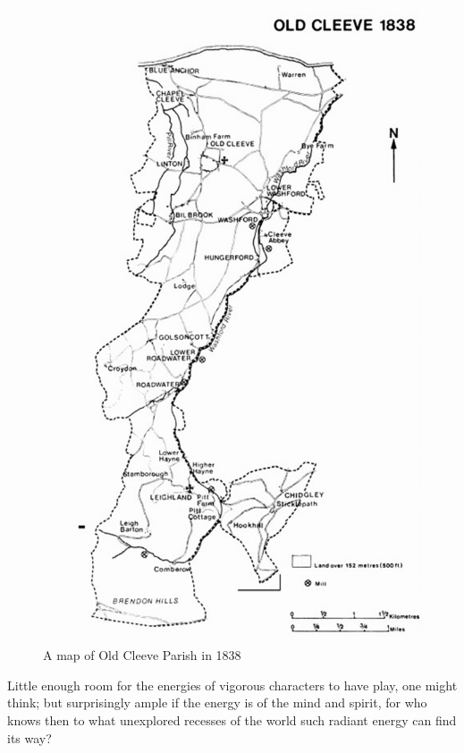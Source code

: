 \begin{figure}
	 \centering
     \includegraphics[width=1\textwidth]{figures/oldCleeve}
     \caption{A map of Old Cleeve Parish in 1838}
     \label{fig:OldCleeve}
\end{figure}
 
Little enough room for the energies of vigorous characters to have play, one might think; but surprisingly ample if the energy is of the mind and spirit, for who knows then to what unexplored recesses of the world such radiant energy can find its way? 

